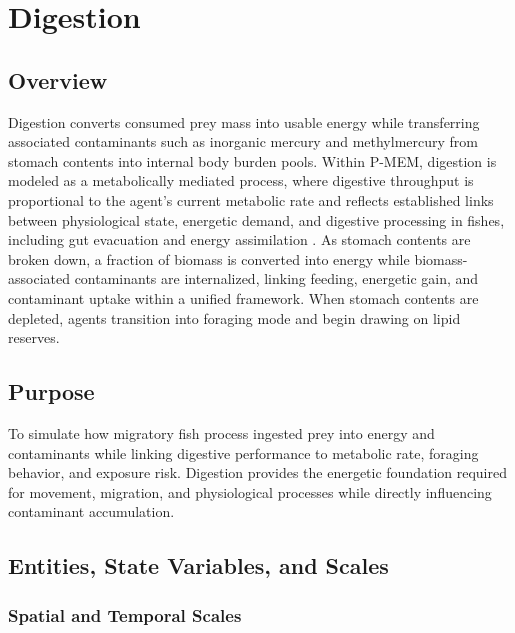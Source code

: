 \documentclass[
]{book}
\begin{document}
\chapter{Digestion}\label{digestion}

\section{Overview}\label{overview-1}

Digestion converts consumed prey mass into usable energy while transferring associated contaminants such as inorganic mercury and methylmercury from stomach contents into internal body burden pools. Within P-MEM, digestion is modeled as a metabolically mediated process, where digestive throughput is proportional to the agent's current metabolic rate and reflects established links between physiological state, energetic demand, and digestive processing in fishes, including gut evacuation and energy assimilation \citep{volkoff_effects_2020, fu_behavioural_2009}. As stomach contents are broken down, a fraction of biomass is converted into energy while biomass-associated contaminants are internalized, linking feeding, energetic gain, and contaminant uptake within a unified framework. When stomach contents are depleted, agents transition into foraging mode and begin drawing on lipid reserves.

\section{Purpose}\label{purpose-1}

To simulate how migratory fish process ingested prey into energy and contaminants while linking digestive performance to metabolic rate, foraging behavior, and exposure risk. Digestion provides the energetic foundation required for movement, migration, and physiological processes while directly influencing contaminant accumulation.

\section{Entities, State Variables, and Scales}\label{entities-state-variables-and-scales-1}

\subsection{Spatial and Temporal Scales}\label{spatial-and-temporal-scales-1}
\end{document}
